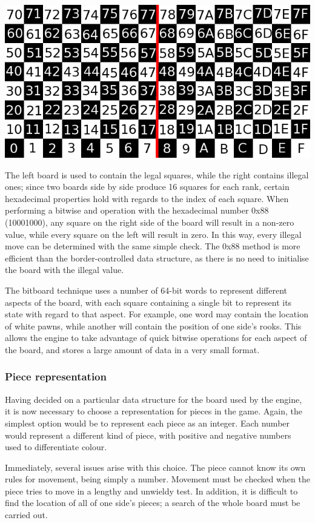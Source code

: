 \documentclass{l3proj}
\begin{document}
\includegraphics[scale = 0.5]{images/0x88.png}

 	The left board is used to contain the legal squares, while the right contains illegal ones; since two boards side by side produce 16 squares for each rank, certain hexadecimal properties hold with regards to the index of each square. When performing a bitwise and operation with the hexadecimal number 0x88 (10001000), any square on the right side of the board will result in a non-zero value, while every square on the left will result in zero. In this way, every illegal move can be determined with the same simple check. The 0x88 method is more efficient than the border-controlled data structure, as there is no need to initialise the board with the illegal value.

	The bitboard technique uses a number of 64-bit words to represent different aspects of the board, with each square containing a single bit to represent its state with regard to that aspect. For example, one word may contain the location of white pawns, while another will contain the position of one side's rooks. This allows the engine to take advantage of quick bitwise operations for each aspect of the board,  and stores a large amount of data in a very small format.

\subsubsection{Piece representation}

	Having decided on a particular data structure for the board used by the engine, it is now necessary to choose a representation for pieces in the game. Again, the simplest option would be to represent each piece as an integer. Each number would represent a different kind of piece, with positive and negative numbers used to differentiate colour.

	Immediately, several issues arise with this choice. The piece cannot know its own rules for movement, being simply a number. Movement must be checked when the piece tries to move in a lengthy and unwieldy test. In addition, it is difficult to find the location of all of one side’s pieces; a search of the whole board must be carried out.
\end{document}
